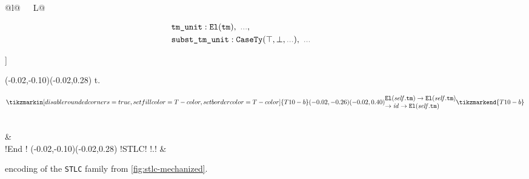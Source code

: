 \begin{figure}
\begin{tabular}{@{}l@{\ \ \ }L@{}}
{{\begin{minipage}{.31\textwidth}
\begin{gather*}
\begin{array}{@{}l@{}}
        \texttt{tm\_unit} : \El{\texttt{tm}},\ 
        \dadada,
        \smallskip\\
        \texttt{subst\_tm\_unit} : \CaseSig{\top}{\bot}{\dadada},\ 
        \dadada
    \end{array}
    \end{gather*}
    \end{minipage}
    }\right]\!
}{
    (-0.02,-0.10)(-0.02,0.28)
    \lambda t.\,
    \tikzmarkend{t10-b}
}{
    \begin{minipage}{.20\textwidth}%
    \vspace{-7.5pt}%
    \fontsize{8.0}{9.2}\selectfont%
    \begin{gather*}
    \tikzmarkin[disable rounded corners=true,set fill color=T-color,set border color=T-color]{T10-b}(-0.02,-0.26)(-0.02,0.40)
    \begin{array}{@{}l@{}}
        \El{\mathit{self}.\texttt{tm}} \to \El{\mathit{self}.\texttt{tm}}
        \\
        \to \mathit{id} \to \El{\mathit{self}.\texttt{tm}}
    \end{array}
    \tikzmarkend{T10-b}
    \end{gather*}
    \end{minipage}
}
\\
\dadada
&
\dadada
\\
\lsti!End !%
(-0.02,-0.10)(-0.02,0.28)%
\lsti!STLC!%
\tikzmarkend{t-STLC-c}%
\lsti!.!
&
\end{tabular}

\caption{\TT encoding of the \texttt{STLC} family from \cref{fig:stlc-mechanized}.}
\label{fig:stlc-linkage-typing}
\end{figure}

